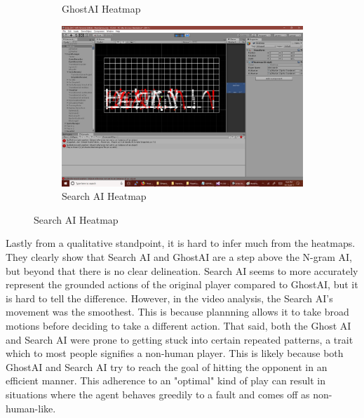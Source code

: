 \begin{figure}[h]
\begin{subfigure}[h]{0.4\textwidth}
		\caption{GhostAI Heatmap}
		\label{}
	\end{subfigure}
	\begin{subfigure}[h]{0.4\textwidth}
		\centering
		\includegraphics[width=\textwidth]{Figures/HeatmapAI.png}
		\caption{Search AI Heatmap}
		\label{}
	\end{subfigure}
\end{figure}

Lastly from a qualitative standpoint, it is hard to infer much from the heatmaps. They clearly show that Search AI and GhostAI are a step above the N-gram AI, but beyond that there is no clear delineation. Search AI seems to more accurately represent the grounded actions of the original player compared to GhostAI, but it is hard to tell the difference. However, in the video analysis, the Search AI's movement was the smoothest. This is because plannning allows it to take broad motions before deciding to take a different action. That said, both the Ghost AI and Search AI were prone to getting stuck into certain repeated patterns, a trait which to most people signifies a non-human player. This is likely because both GhostAI and Search AI try to reach the goal of hitting the opponent in an efficient manner. This adherence to an "optimal" kind of play can result in situations where the agent behaves greedily to a fault and comes off as non-human-like.


